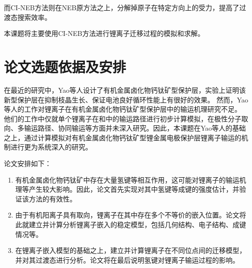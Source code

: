 而CI-NEB方法则在NEB原方法之上，分解掉原子在特定方向上的受力，提高了过渡态搜索效率。

本课题将主要使用CI-NEB方法进行锂离子迁移过程的模拟和求解。

\section{论文选题依据及安排}

在最近的研究中，Yao等人设计了有机金属卤化物钙钛矿型保护层，实验上证明该新型保护层在抑制枝晶生长、保证电池良好循环性能上有很好的效果。
然而，Yao等人的工作对锂离子在有机金属卤化物钙钛矿型保护层中的输运机理研究不足。
他们的工作中仅就单个锂离子在和中的输运路径进行初步计算模拟，在极性分子取向、多输运路径、协同输运等方面并未深入研究。因此，本课题在Yao等人的基础之上，通过计算模拟对有机金属卤化物钙钛矿型锂金属电极保护层锂离子输运的机制进行更为系统深入的研究。

论文安排如下：

\begin{enumerate}
    \item 有机金属卤化物钙钛矿中存在大量氢键等相互作用，这可能对锂离子的输运机理等产生较大影响。因此，论文首先实现对其中氢键等成键的强度估计，并验证该方法的有效性。
    \item 由于有机阳离子具有取向，锂离子在其中存在多个不等价的嵌入位置。论文将此就建立并计算分析锂离子嵌入的稳定模型，包括几何结构、电子结构、成键情况等。
    \item 在锂离子嵌入模型的基础之上，建立并计算锂离子在不同位点间的迁移模型，并对其过渡态进行分析。论文将在最后说明氢键对锂离子输运过程的影响。
\end{enumerate}

